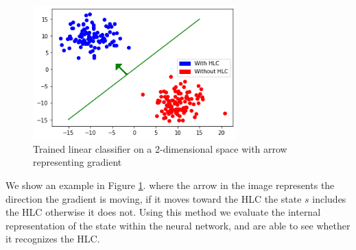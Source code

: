 \begin{figure}[]
    \centering
    \includegraphics[width=0.7\textwidth]{graphics/linear_separation_with_direction}
    \caption{Trained linear classifier on a 2-dimensional space with arrow representing gradient}
    \label{fig:scattersplitarrow}
\end{figure}
We show an example in Figure \ref{fig:scattersplitarrow}. where the arrow in the image represents the direction the gradient is moving, if it moves toward the HLC the state $s$ includes the HLC otherwise it does not. Using this method we evaluate the internal representation of the state within the neural network, and are able to see whether it recognizes the HLC. 


